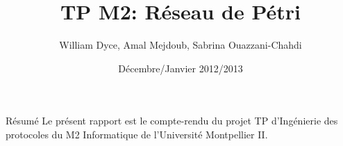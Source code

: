 \documentclass[a4paper, 12pt]{article}
\title{TP M2: Réseau de Pétri} \author{William Dyce, Amal Mejdoub, Sabrina Ouazzani-Chahdi}
\date{Décembre/Janvier 2012/2013}
\begin{document}
\newcommand\bcdef{\texttt{[image: def.png]}}

\maketitle

\begin{bclogo}[couleur=blue!15, arrondi=0.1, logo= \bcdef,
    ombre=true, epOmbre=0.25, couleurOmbre=black!30, epBarre=1,
    barre=zigzag]{Résumé} Le présent rapport est le compte-rendu du
  projet TP d'Ingénierie des protocoles du M2 Informatique de
  l'Université Montpellier II.
\end{bclogo}


















\end{document}
